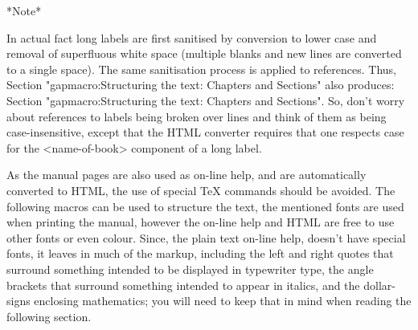*Note*

In actual fact long labels are first sanitised by conversion to lower case
and removal of superfluous white space (multiple blanks and new lines are
converted to a single space). The same sanitisation process is applied to
references. Thus,
\begintt
Section "gapmacro:Structuring the text:                          Chapters
and Sections"
\endtt
also produces:
Section "gapmacro:Structuring the text:                          Chapters
and Sections".
So, don't worry about references to labels being broken over  lines
and think of  them  as  being  case-insensitive,  except  that  the  HTML
converter  requires  that  one  respects  case  for  the   <name-of-book>
component of a long label.


\indextt{\\lq}\indextt{\\pif}\indextt{\\rq}
\indextt{\\>}\indextt{\\index}\indextt{\\indextt}
\indextt{\\atindex}
\indextt{\\fmark}
\indextt{\\URL}\indextt{\\Mailto}
\indextt{\\Package}\indextt{\\package}
As the manual pages are also used as on-line help, and are  automatically
converted to HTML, the use of special {\TeX} commands should be  avoided.
The following macros can be used to structure  the  text,  the  mentioned
fonts are used when printing the manual, however  the  on-line  help  and
HTML are free to use other fonts or even colour. Since,  the  plain  text
on-line help, doesn't have special  fonts,  it  leaves  in  much  of  the
markup, including the left  and  right  quotes  that  surround  something
intended to be displayed in typewriter  type,  the  angle  brackets  that
surround something intended to appear in italics,  and  the  dollar-signs
enclosing mathematics; you will need to keep that in  mind  when  reading
the following section.

